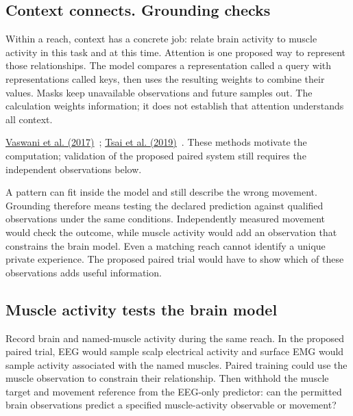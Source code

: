 \subsection{Context connects. Grounding checks}
Within a reach, context has a concrete job: relate brain activity to muscle
activity in this task and at this time. Attention is one proposed way to
represent those relationships. The model compares a representation called a query with representations called keys, then uses the resulting weights to combine their values. Masks keep unavailable observations and future
samples out. The calculation weights information; it does not establish that
attention understands all context.
\par\noindent \href{https://arxiv.org/html/1706.03762v7}{Vaswani et al. (2017)}~\cite{vaswani2017}; \href{https://aclanthology.org/P19-1656/}{Tsai et al. (2019)}~\cite{tsai2019}. These methods motivate the computation; validation of the proposed paired system still requires the independent observations below.

A pattern can fit inside the model and still describe the wrong movement.
Grounding therefore means testing the declared prediction against qualified
observations under the same conditions. Independently measured movement would
check the outcome, while muscle activity would add an observation that
constrains the brain model. Even a matching reach cannot identify a unique
private experience. The proposed paired trial would have to show which of
these observations adds useful information.

\subsection{Muscle activity tests the brain model}
Record brain and named-muscle activity during the same reach. In the proposed
paired trial, EEG would sample scalp electrical activity and surface EMG would
sample activity associated with the named muscles. Paired training could use
the muscle observation to constrain their relationship. Then withhold the
muscle target and movement reference from the EEG-only predictor: can the
permitted brain observations predict a specified muscle-activity observable
or movement?


